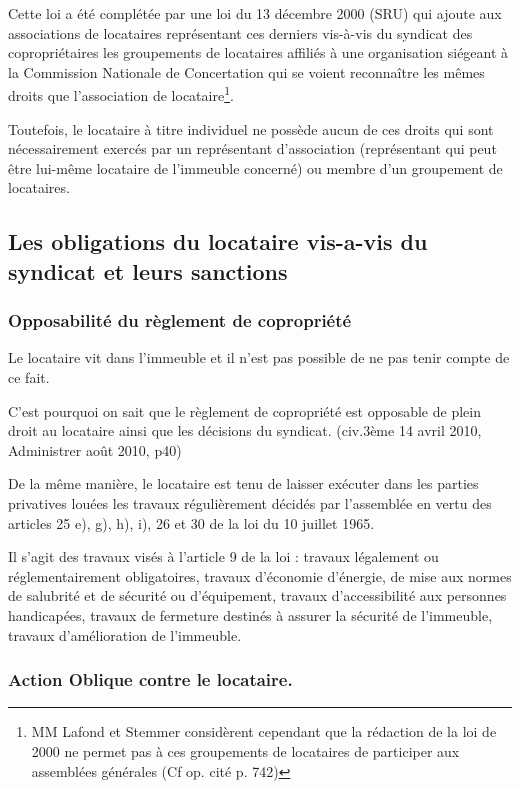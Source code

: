 		Cette loi a été complétée par une loi du 13 décembre 2000 (SRU) qui ajoute aux associations de locataires représentant ces derniers vis-à-vis du syndicat des copropriétaires les groupements de locataires affiliés à une organisation siégeant à la Commission Nationale de Concertation qui se voient reconnaître les mêmes droits que l’association de locataire\footnote{MM Lafond et Stemmer considèrent cependant que la rédaction de la loi de 2000 ne permet pas à ces groupements de locataires de participer aux assemblées générales (Cf op. cité p. 742)}.
		
		Toutefois, le locataire à titre individuel ne possède aucun de ces droits qui sont nécessairement exercés par un représentant d'association (représentant qui peut être lui-même locataire de l'immeuble concerné) ou membre d’un groupement de locataires.
	
	\subsection{Les obligations du locataire vis-a-vis du syndicat et leurs sanctions}
	
		\subsubsection{Opposabilité du règlement de copropriété}
		
			Le locataire vit dans l'immeuble et il n'est pas possible de ne pas tenir compte de ce fait.
			
			C'est pourquoi on sait que le règlement de copropriété est opposable de plein droit au locataire ainsi que les décisions du syndicat. (civ.3ème 14 avril 2010, Administrer août 2010, p40)
		
			De la même manière, le locataire est tenu de laisser exécuter dans les parties privatives louées les travaux régulièrement décidés par l'assemblée en vertu des articles 25 e), g), h), i), 26 et 30 de la loi du 10 juillet 1965.
			
			Il s'agit des travaux visés à l'article 9 de la loi : travaux légalement ou réglementairement obligatoires, travaux d'économie d'énergie, de mise aux normes de salubrité et de sécurité ou d'équipement, travaux d'accessibilité aux personnes handicapées, travaux de fermeture destinés à assurer la sécurité de l'immeuble, travaux d'amélioration de l'immeuble.
		
		\subsubsection{Action Oblique contre le locataire.}
		
